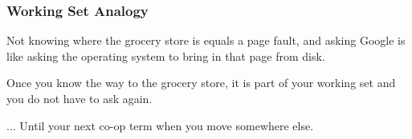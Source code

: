 \begin{frame}
\frametitle{Working Set Analogy}

Not knowing where the grocery store is equals a page fault, and asking Google is like asking the operating system to bring in that page from disk. 

Once you know the way to the grocery store, it is part of your working set and you do not have to ask again.


... Until your next co-op term when you move somewhere else.

\end{frame}



